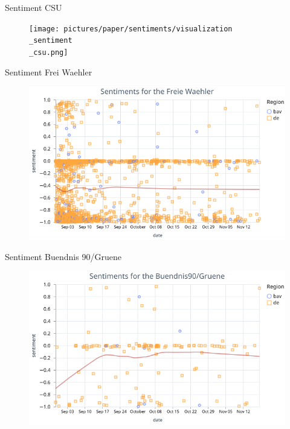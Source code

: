 \begin{frame}{Sentiment CSU}
	\begin{figure}[htbp]
		\centering
		\texttt{[image: pictures/paper/sentiments/visualization\\\_sentiment\\\_csu.png]}
	\end{figure}
\end{frame}





\begin{frame}{Sentiment Frei Waehler}
	\begin{figure}[htbp]
		\centering
		\includegraphics[height=0.9\textheight, keepaspectratio]{pictures/paper/sentiments/visualization_sentiment_fw.png}
	\end{figure}
\end{frame}


\begin{frame}{Sentiment Buendnis 90/Gruene}
	\begin{figure}[htbp]
		\centering
		\includegraphics[height=0.9\textheight, keepaspectratio]{pictures/paper/sentiments/visualization_sentiment_gruene.png}
	\end{figure}
\end{frame}
